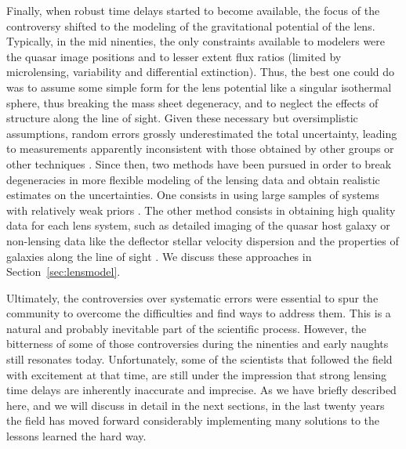 Finally, when robust time delays started to become available, the
focus of the controversy shifted to the modeling of the gravitational
potential of the lens. Typically, in the mid ninenties, the only
constraints available to modelers were the quasar image positions and
to lesser extent flux ratios (limited by microlensing, variability and
differential extinction). Thus, the best one could do was to assume
some simple form for the lens potential like a singular isothermal
sphere, thus breaking the mass sheet degeneracy, and to neglect the
effects of structure along the line of sight. Given these necessary
but oversimplistic assumptions, random errors grossly underestimated
the total uncertainty, leading to measurements apparently inconsistent
with those obtained by other groups or other techniques
\cite{K+S04}. Since then, two methods have been pursued in order to
break degeneracies in more flexible modeling of the lensing data and
obtain realistic estimates on the uncertainties. One consists in using
large samples of systems with relatively weak priors
\cite{Ogu07b}. The other method consists in obtaining high quality data for 
each lens system, such as detailed imaging of the quasar host galaxy
\cite{Keeton:2000p241,WBB04,Suy++06} or non-lensing data like the deflector 
stellar velocity dispersion \cite{T+K02b} and the properties of
galaxies along the line of sight \cite{K+Z04,Suy++10}. We discuss
these approaches in Section~\ref{sec:lensmodel}.

Ultimately, the controversies over systematic errors were essential to
spur the community to overcome the difficulties and find ways to
address them. This is a natural and probably inevitable part of the
scientific process. However, the bitterness of some of those
controversies during the ninenties and early naughts still resonates
today. Unfortunately, some of the scientists that followed the field
with excitement at that time, are still under the impression that
strong lensing time delays are inherently inaccurate and imprecise. As
we have briefly described here, and we will discuss in detail in the
next sections, in the last twenty years the field has moved forward
considerably implementing many solutions to the lessons learned the
hard way.
